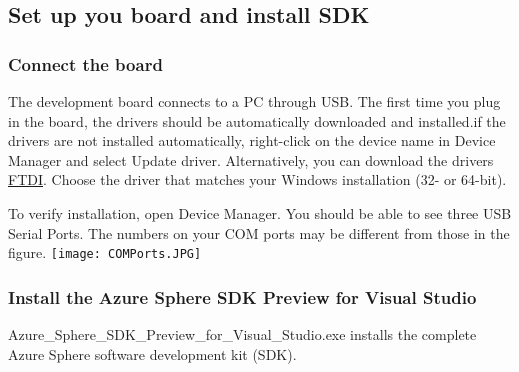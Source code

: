 \label{sec:install}
\subsection{Set up you board and install SDK}

\subsubsection{Connect the board}
The development board connects to a PC through USB. The first time you plug in the board, the drivers should be automatically downloaded and installed.if the drivers are not installed automatically, right-click on the device name in Device Manager and select Update driver. Alternatively, you can download the drivers \hyperlink{https://www.ftdichip.com/Drivers/VCP.htm}{FTDI}. Choose the driver that matches your Windows installation (32- or 64-bit).

To verify installation, open Device Manager. You should be able to see three USB Serial Ports. The numbers on your COM ports may be different from those in the figure.
\texttt{[image: COMPorts.JPG]}

\subsubsection{Install the Azure Sphere SDK Preview for Visual Studio}
Azure\_Sphere\_SDK\_Preview\_for\_Visual\_Studio.exe installs the complete Azure Sphere software development kit (SDK).

